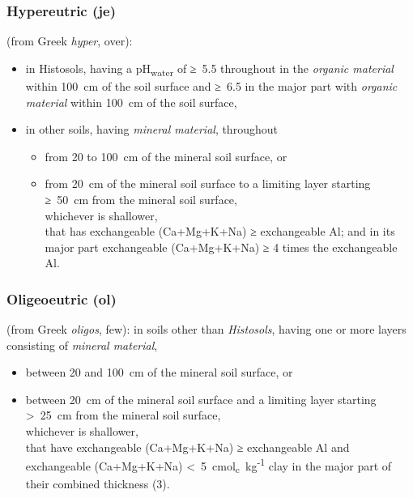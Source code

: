 \documentclass[
  letterpaper,
  DIV=11,
  numbers=noendperiod]{scrreprt}
\begin{document}
\hypertarget{hypereutric-je}{%
\subsubsection{Hypereutric (je)}\label{hypereutric-je}}

(from Greek \emph{hyper}, over):

\begin{itemize}
\item
  in Histosols, having a pH\textsubscript{water} of ≥~5.5 throughout in
  the \emph{organic material} within 100~cm of the soil surface and
  ≥~6.5 in the major part with \emph{organic material} within 100~cm of
  the soil surface,
\item
  in other soils, having \emph{mineral material}, throughout

  \begin{itemize}
  \item
    from 20 to 100~cm of the mineral soil surface, or
  \item
    from 20~cm of the mineral soil surface to a limiting layer starting
    ≥~50~cm from the mineral soil surface,\\
    whichever is shallower,\\
    that has exchangeable (Ca+Mg+K+Na) ≥ exchangeable Al; and in its
    major part exchangeable (Ca+Mg+K+Na) ≥ 4 times the exchangeable Al.
  \end{itemize}
\end{itemize}

\hypertarget{oligeoeutric-ol}{%
\subsubsection{Oligeoeutric (ol)}\label{oligeoeutric-ol}}

(from Greek \emph{oligos}, few): in soils other than \emph{Histosols},
having one or more layers consisting of \emph{mineral material},

\begin{itemize}
\item
  between 20 and 100~cm of the mineral soil surface, or
\item
  between 20~cm of the mineral soil surface and a limiting layer
  starting \textgreater~25~cm from the mineral soil surface,\\
  whichever is shallower,\\
  that have exchangeable (Ca+Mg+K+Na) ≥ exchangeable Al and exchangeable
  (Ca+Mg+K+Na) \textless~5~cmol\textsubscript{c}~kg\textsuperscript{-1}
  clay in the major part of their combined thickness (3).
\end{itemize}
\end{document}
